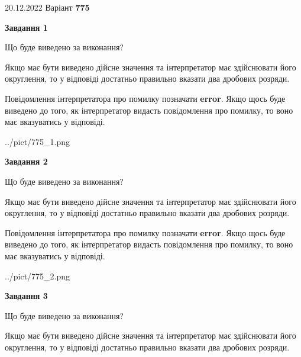 \documentclass[12pt, ukrainian]{article}
\begin{document}
{20.12.2022 Варіант \No \textbf { 775 }\par}
{
\begin {Large}

{\begin {center}\textbf{Завдання 1}\end {center}}\par
Що буде виведено за виконання? \par

Якщо має бути виведено дійсне значення та інтерпретатор має здійснювати його округлення, 
то у відповіді достатньо правильно вказати два дробових розряди.

Повідомлення інтерпретатора про помилку позначати \textbf{error}.
Якщо щось буде виведено до того, як інтерпретатор видасть повідомлення про помилку, 
то воно має вказуватись у відповіді. \par

\begin{center}
	{../pict/775_1.png}
\end{center}
\newpage

{\begin {center}\textbf{Завдання 2}\end {center}}\par
Що буде виведено за виконання? \par

Якщо має бути виведено дійсне значення та інтерпретатор має здійснювати його округлення, 
то у відповіді достатньо правильно вказати два дробових розряди.

Повідомлення інтерпретатора про помилку позначати \textbf{error}.
Якщо щось буде виведено до того, як інтерпретатор видасть повідомлення про помилку, 
то воно має вказуватись у відповіді. \par

\begin{center}
	{../pict/775_2.png}
\end{center}
\newpage

{\begin {center}\textbf{Завдання 3}\end {center}}\par
Що буде виведено за виконання? \par

Якщо має бути виведено дійсне значення та інтерпретатор має здійснювати його округлення, 
то у відповіді достатньо правильно вказати два дробових розряди.


\end{Large}}
\end{document}
